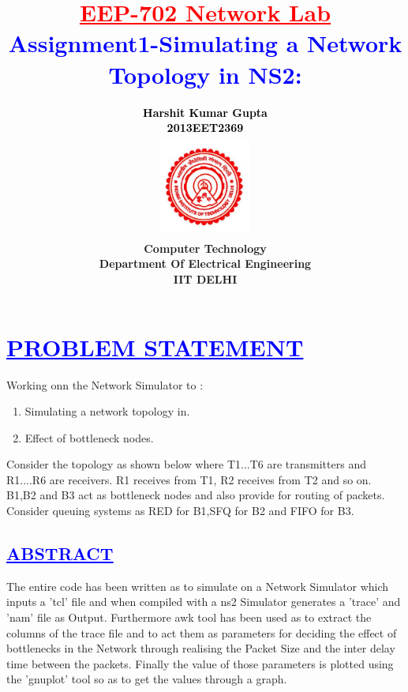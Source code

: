 \documentclass[a4paper,12pt]{report}
\title{\bfseries\huge \textcolor{red}{\underline {EEP-702 Network Lab}} \\{\textcolor{blue}{Assignment1-Simulating a Network Topology in NS2:}}}
\author{\bfseries\large\textcolor{black} {Harshit Kumar Gupta}\\ {\textcolor{black}{2013EET2369}}\\
\includegraphics[width=3cm,height=3.4cm]{./iit.png}\\\noindent Computer Technology\\
\noindent Department Of Electrical Engineering\\IIT DELHI}
\begin{document}
\maketitle
\tableofcontents


\chapter{\textcolor{blue}{\underline {PROBLEM STATEMENT}}}
\noindent 
         Working onn the Network Simulator to :
	
	\begin{enumerate}
	  \item Simulating a network topology in.
	  \item Effect of bottleneck nodes.
 
	\end{enumerate}

Consider the topology as shown below where T1...T6  are transmitters and R1....R6 are receivers.
 R1 receives from T1, R2 receives from T2 and so on. B1,B2 and B3 act as bottleneck nodes
 and also provide for routing of packets. Consider queuing systems as RED for B1,SFQ for B2
  and FIFO for B3.

\begin{center}
\chapter{\textcolor{blue}{\underline {ABSTRACT}}}
\end{center}
\noindent The entire code has been written as to simulate on a Network Simulator which inputs a 'tcl' file and when compiled with a ns2 Simulator generates a 'trace' and 'nam' file as Output.
	  Furthermore awk tool has been used as to extract the columns of the trace file and to act them as parameters for deciding the effect of bottlenecks in the Network through
	  realising the Packet Size and the inter delay time between the packets. Finally the value of those parameters is plotted using the 'gnuplot' tool so as to get the  values through a graph.
\end{document}
